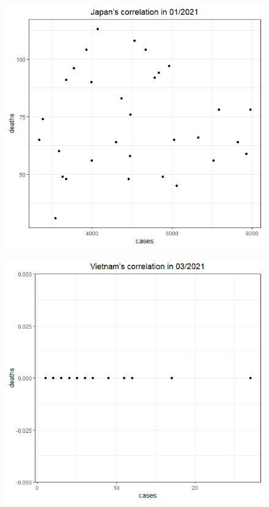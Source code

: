 \documentclass[a4paper]{article}
\theoremstyle{definition}
\begin{document}
\begin{enumerate}[1)]
\begin{figure}[H]
\begin{center}
        \includegraphics[scale = 0.3]{ix/ix.2/JPN_01_2021.png}
    \end{center}
    \end{figure}
    \begin{figure}[H]
    \begin{center}
        \includegraphics[scale = 0.3]{ix/ix.2/VN_03_2021.png}

\end{center}
\end{figure}
\end{enumerate}
\end{document}

